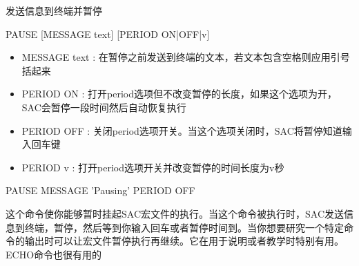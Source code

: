 \label{cmd:pause}

发送信息到终端并暂停

\begin{SACSTX}
PAUSE [MESSAGE text] [PERIOD ON|OFF|v]
\end{SACSTX}

\begin{itemize}
\item MESSAGE text : 在暂停之前发送到终端的文本，若文本包含空格则应用引号括起来 
\item PERIOD ON : 打开period选项但不改变暂停的长度，如果这个选项为开，SAC会暂停一段时间然后自动恢复执行
\item PERIOD OFF : 关闭period选项开关。当这个选项关闭时，SAC将暂停知道输入回车键
\item PERIOD v : 打开period选项开关并改变暂停的时间长度为v秒
\end{itemize}

\begin{SACDFT}
PAUSE MESSAGE 'Pausing' PERIOD OFF
\end{SACDFT}

这个命令使你能够暂时挂起SAC宏文件的执行。当这个命令被执行时，SAC发送信息到终端，暂停，然后等到你输入回车或者暂停时间到。当你想要研究一个特定命令的输出时可以让宏文件暂停执行再继续。它在用于说明或者教学时特别有用。ECHO命令也很有用的

